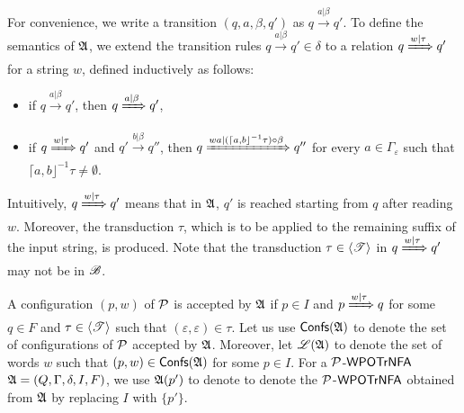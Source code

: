 For convenience, we write a transition $(q, a, \beta, q')$ as $q \xrightarrow{a | \beta} q'$. 
To define the semantics of ${\mathfrak{A} }$, we extend the transition rules $q \xrightarrow{a | \beta} q' \in \delta$  to a relation $q \xRightarrow{w | \tau} q'$ for a string $w$,  
%
defined inductively as follows:
\begin{itemize}
	\item if $q \xrightarrow{a |\beta} q'$, then $q \xRightarrow{a | \beta} q'$, 
	\item if $q \xRightarrow{w | \tau} q'$ and $q' \xrightarrow{b |\beta } q'' $, then $q \xRightarrow{w a | (\lceil a, b\rfloor^{-1}\tau) \circ \beta} q''$ for every $a \in \Gamma_\varepsilon$ such that $\lceil a, b\rfloor^{-1}\tau \neq \emptyset$.
\end{itemize}
Intuitively, $q \xRightarrow{w | \tau} q'$ means that in ${\mathfrak{A} }$,  $q'$ is reached starting from $q$ after reading $w$. Moreover, the transduction $\tau$, which is  to be applied to the remaining suffix of the input string, is produced. Note that the transduction  $\tau \in \langle {\mathscr{T} } \rangle$ in $q \xRightarrow{w | \tau} q'$ may not be in ${\mathscr{B} }$. 

A configuration $(p, w)$ of ${\mathcal{P} }$ is accepted by ${\mathfrak{A} }$ if $p\in I$ and $p \xRightarrow{w | \tau} q$ for some $q \in F$ and $\tau \in \langle {\mathscr{T} } \rangle$ such that $(\varepsilon, \varepsilon) \in \tau$.
%
Let us use ${\mathsf{Confs} }({\mathfrak{A} })$ to denote the set of configurations of ${\mathcal{P} }$ accepted by ${\mathfrak{A} }$.
Moreover, let ${\mathscr{L} }({\mathfrak{A} })$ to denote the set of words $w$ such that $(p, w)\in{\mathsf{Confs} }({\mathfrak{A} })$ for some $p \in I$.
For a ${\mathcal{P} }$-$\textsf{WPOTrNFA}$ ${\mathfrak{A} } = (Q, \Gamma, \delta, I, F)$, we use ${\mathfrak{A} }(p')$ to denote to denote the ${\mathcal{P} }$-$\textsf{WPOTrNFA}$ obtained from ${\mathfrak{A} }$ by replacing $I$ with $\{p'\}$.


